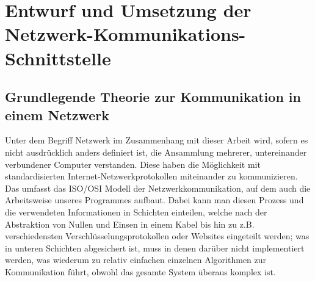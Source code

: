 
%
\section{Entwurf und Umsetzung der Netzwerk-Kommunikations-Schnittstelle}
\subsection{Grundlegende Theorie zur Kommunikation in einem Netzwerk}
Unter dem Begriff Netzwerk im Zusammenhang mit dieser Arbeit wird, sofern es nicht ausdrücklich anders definiert ist, die Ansammlung mehrerer, untereinander verbundener Computer verstanden.
Diese haben die Möglichkeit mit standardisierten Internet-Netzwerkprotokollen miteinander zu kommunizieren.
Das umfasst das ISO/OSI Modell der Netzwerkkommunikation, auf dem auch die Arbeitsweise unseres Programmes aufbaut.
Dabei kann man diesen Prozess und die verwendeten Informationen in Schichten einteilen, welche nach der Abstraktion von Nullen und Einsen in einem Kabel bis hin zu z.B. verschiedensten Verschlüsselungsprotokollen oder Websites eingeteilt werden; was in unteren Schichten abgesichert ist, muss in denen darüber nicht implementiert werden, was wiederum zu relativ einfachen einzelnen Algorithmen zur Kommunikation führt, obwohl das gesamte System überaus komplex ist.

